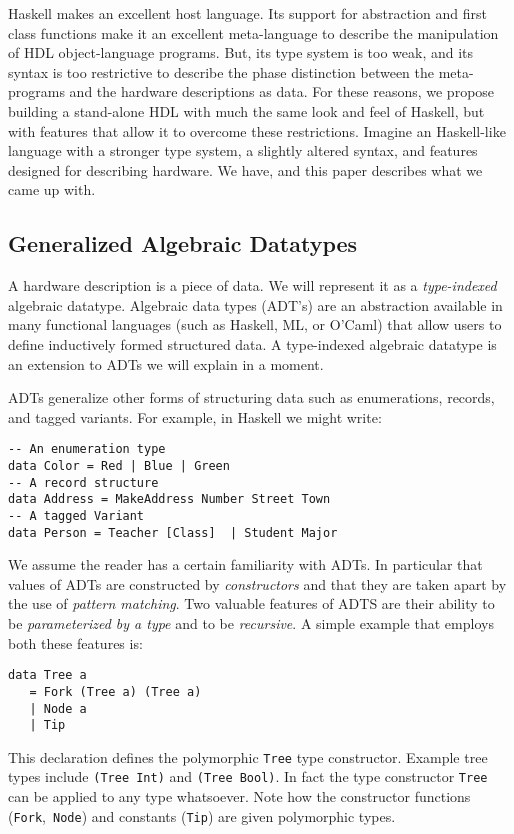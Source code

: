 \documentclass[10pt,twoside]{article}
\begin{document}
Haskell makes an excellent host language. Its support for abstraction
and first class functions make it an excellent meta-language to
describe the manipulation of HDL object-language programs. But, its
type system is too weak, and its syntax is too restrictive to
describe the phase distinction between the meta-programs and the
hardware descriptions as data. For these reasons, we propose building
a stand-alone HDL with much the same look and feel of Haskell, but
with features that allow it to overcome these
restrictions. Imagine an Haskell-like language with a stronger type
system, a slightly altered syntax, and features designed for
describing hardware. We have, and this paper describes what we came up with.

\subsection{Generalized Algebraic Datatypes}

A hardware description is a piece of data. We will represent it as a {\em
type-indexed} algebraic datatype. Algebraic data types (ADT's) are an
abstraction available in many functional languages (such as Haskell, ML, or
O'Caml) that allow users to define inductively formed structured data. A
type-indexed algebraic datatype is an extension to ADTs we will explain in a
moment.

ADTs generalize other forms of structuring data such as enumerations,
records, and tagged variants. For example,
in Haskell we might write:

\begin{verbatim}
-- An enumeration type
data Color = Red | Blue | Green
-- A record structure
data Address = MakeAddress Number Street Town 
-- A tagged Variant
data Person = Teacher [Class]  | Student Major
\end{verbatim}

We assume the reader has a certain familiarity with ADTs. In
particular that values of ADTs are constructed by {\em constructors}
and that they are taken apart by the use of {\em pattern matching}.
Two valuable features of ADTS are their ability to be {\em
parameterized by a type} and to be {\em recursive}. A simple example
that employs both these features is:
\begin{verbatim}
data Tree a 
   = Fork (Tree a) (Tree a) 
   | Node a 
   | Tip
\end{verbatim}
This declaration defines the polymorphic {\tt Tree} type constructor. Example tree
types include {\tt (Tree Int)} and {\tt (Tree Bool)}. In fact the
type constructor {\tt Tree} can be applied to any type whatsoever.
Note how the constructor functions ({\tt Fork},\ {\tt Node}) and constants ({\tt Tip})
are given polymorphic types.
\end{document}
